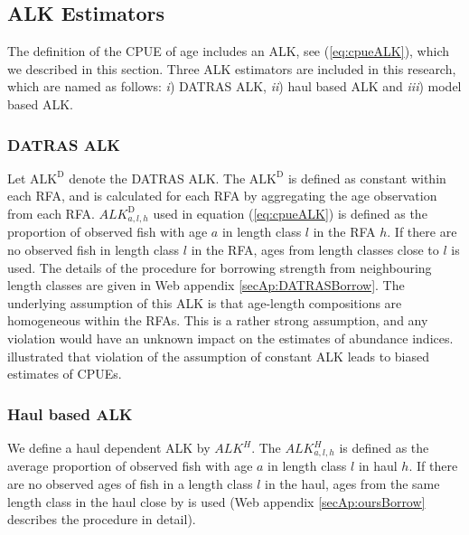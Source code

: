 \documentclass[a4paper 12pt]{article}
\numberwithin{equation}{section}
\begin{document}
 

\subsection{ALK Estimators}

The definition of the CPUE of age includes an ALK, see (\ref{eq:cpueALK}), which we described in this section. Three ALK estimators are included in this research, which are named as follows:  \textit{i}) DATRAS ALK, \textit{ii}) haul based ALK and \textit{iii}) model based ALK.
\subsubsection{DATRAS ALK}
\label{sec:datrasalkestimator}
Let $\text{ALK}^{\text{D}}$ denote the DATRAS ALK. The $\text{ALK}^{\text{D}}$ is defined as constant within each RFA, and is calculated for each RFA by aggregating the age observation from each RFA. $ALK^{\text{D}}_{a,l,h}$ used in equation (\ref{eq:cpueALK}) is defined as the proportion of observed fish with age $a$ in length class $l$ in the RFA $h$. If there are no observed fish in length class $l$ in the RFA, ages from length classes close to $l$ is used. The details of the procedure for borrowing strength from neighbouring length classes are given in Web appendix \ref{secAp:DATRASBorrow}. The underlying assumption of this ALK  is that age-length compositions are homogeneous within the RFAs. This is a rather strong assumption, and any violation would have an unknown impact on the estimates of abundance indices. \citet{aanes2015efficient} illustrated that violation of the assumption of constant ALK leads to biased estimates of CPUEs. 

\subsubsection{Haul based ALK}
\label{sec:haulestimator}
We define a haul dependent ALK  by  $ALK^{H}$. The $ALK^{H}_{a,l,h}$ is defined as the average proportion of observed fish with age $a$ in  length class $l$ in haul $h$. If there are no observed ages of fish in a length class $l$ in the haul, ages from the same length class in the haul close by is used (Web appendix \ref{secAp:oursBorrow} describes the procedure in detail).
\end{document}
